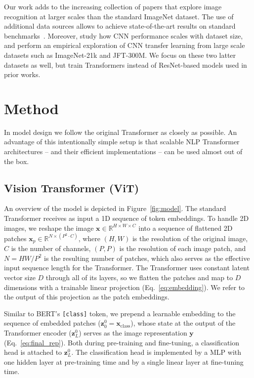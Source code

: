 Our work adds to the increasing collection of papers that explore image recognition at larger scales than the standard ImageNet dataset. The use of additional data sources allows to achieve state-of-the-art results on standard benchmarks~\citep{mahajan2018, touvron2019, xie2020-noisystudent}. Moreover, \citet{sun2017-jft} study how CNN performance scales with dataset size, and \citet{kolesnikov2020-bit, djolonga2020-robustness} perform an empirical exploration of CNN transfer learning from large scale datasets such as ImageNet-21k and JFT-300M. We focus on these two latter datasets as well, but train Transformers instead of ResNet-based models used in prior works. 

\newcommand{\op}[1]{\operatorname{#1}}
\newcommand{\mbf}[1]{\mathbf{#1}}

\section{Method}

In model design we follow the original Transformer \citep{vaswani2017} as closely as possible. An advantage of this intentionally simple setup is that scalable NLP Transformer architectures -- and their efficient implementations -- can be used almost out of the box.

\subsection{Vision Transformer (ViT)}\label{sec:patch_transformer}

An overview of the model is depicted in Figure~\ref{fig:model}.
The standard Transformer receives as input a 1D sequence of token embeddings. To handle 2D images, we reshape the image $\mathbf{x} \in \mathbb{R}^{H \times W \times C}$ into a sequence of flattened 2D patches $\mathbf{x}_p \in \mathbb{R}^{N \times (P^2 \cdot C)}$, where $(H, W)$ is the resolution of the original image, $C$ is the number of channels, $(P,P)$ is the resolution of each image patch, and $N=HW/P^2$ is the resulting number of patches, which also serves as the effective input sequence length for the Transformer. The Transformer uses constant latent vector size $D$ through all of its layers, so we flatten the patches and map to $D$ dimensions with a trainable linear projection (Eq.~\ref{eq:embedding}).
We refer to the output of this projection as the patch embeddings.

Similar to BERT's \verb|[class]| token, we prepend a learnable embedding to the sequence of embedded patches ($\mathbf{z}_0^0=\mathbf{x}_\text{class}$), whose state at the output of the Transformer encoder ($\mathbf{z}^0_L$) serves as the image representation $\mathbf{y}$ (Eq.~\ref{eq:final_rep}). 
Both during pre-training and fine-tuning, a classification head is attached to $\mathbf{z}^0_L$.
The classification head is implemented by a MLP with one hidden layer at pre-training time and by a single linear layer at fine-tuning time.

